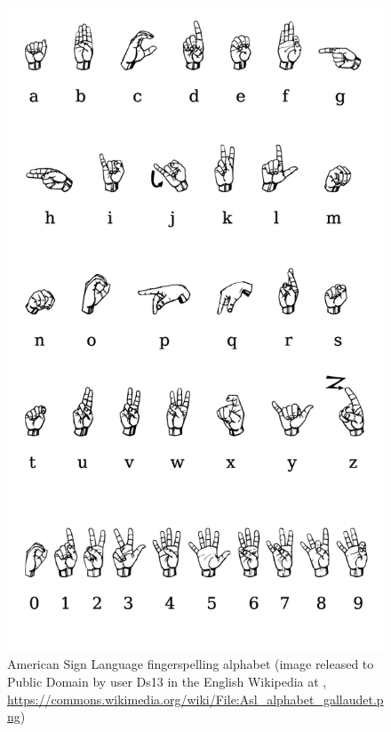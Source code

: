\documentclass[output=paper]{langsci/langscibook}
\begin{document}
\begin{figure}[tb]
  \centering
  \includegraphics[width=0.5\linewidth]{figures/Asl-alphabet-gallaudet.png}
  \caption[ASL fingerspelling]{American Sign Language fingerspelling alphabet (image released to Public Domain by user Ds13 in the English Wikipedia at , \url{https://commons.wikimedia.org/wiki/File:Asl_alphabet_gallaudet.png})}
  \label{fig:asl}
\end{figure}
\end{document}
